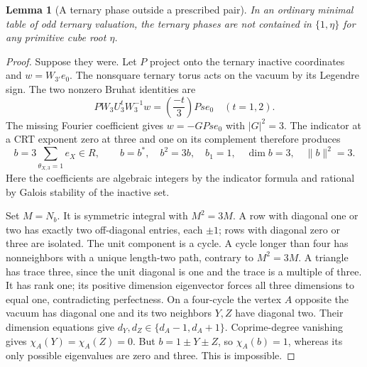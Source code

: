 \documentclass[11pt,a4paper]{article}
\numberwithin{equation}{section}
\newtheorem{lemma}[theorem]{Lemma}
\begin{document}
\begin{lemma}[A ternary phase outside a prescribed pair]
\label{red:ef:ternary-missing-phase}
In an ordinary minimal table of odd ternary valuation, the
ternary phases are not contained in $\{1,\eta\}$ for any
primitive cube root $\eta$.
\end{lemma}
\begin{proof}
Suppose they were. Let $P$ project onto the ternary inactive
coordinates and $w=W_{3'}e_0$. The nonsquare ternary torus
acts on the vacuum by its Legendre sign. The two nonzero
Bruhat identities are
\[
 PW_3U_3^tW_3^{-1}w
       =\left(\frac{-t}{3}\right)Pse_0\quad(t=1,2).
\]
The missing Fourier coefficient gives $w=-G Pse_0$ with
$|G|^2=3$. The indicator at a CRT exponent zero at three and
one on its complement therefore produces
\[
 b=3\sum_{\theta_{X,3}=1}e_X\in R,\qquad
 b=b^*,\quad b^2=3b,\quad b_1=1,\quad\dim b=3,
 \quad\|b\|^2=3.
\]
Here the coefficients are algebraic integers by the indicator
formula and rational by Galois stability of the inactive set.

Set $M=N_b$. It is symmetric integral with $M^2=3M$.
A row with diagonal one or two has exactly two off-diagonal
entries, each $\pm1$; rows with diagonal zero or three are
isolated. The unit component is a cycle. A cycle longer than
four has nonneighbors with a unique length-two path, contrary
to $M^2=3M$. A triangle has trace three, since the unit diagonal
is one and the trace is a multiple of three. It has rank one;
its positive dimension eigenvector forces all three dimensions
to equal one, contradicting perfectness.
On a four-cycle the vertex $A$ opposite the vacuum has diagonal
one and its two neighbors $Y,Z$ have diagonal two. Their
dimension equations give $d_Y,d_Z\in\{d_A-1,d_A+1\}$.
Coprime-degree vanishing gives $\chi_A(Y)=\chi_A(Z)=0$.
But $b=1\pm Y\pm Z$, so $\chi_A(b)=1$, whereas its only
possible eigenvalues are zero and three. This is impossible.
\end{proof}
\end{document}
